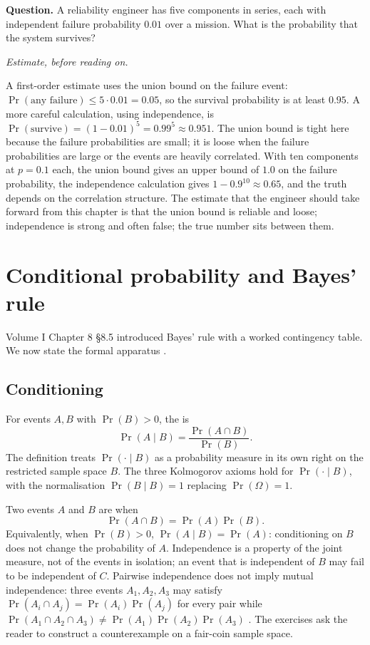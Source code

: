 \begin{estimation}
\textbf{Question.} A reliability engineer has five components in
series, each with independent failure probability $0.01$ over a
mission. What is the probability that the system survives?

\smallskip
\textit{Estimate, before reading on.}

\smallskip
A first-order estimate uses the union bound on the failure event:
$\Pr(\text{any failure}) \leq 5 \cdot 0.01 = 0.05$, so the survival
probability is at least $0.95$. A more careful calculation, using
independence, is $\Pr(\text{survive}) = (1 - 0.01)^{5} = 0.99^{5}
\approx 0.951$. The union bound is tight here because the failure
probabilities are small; it is loose when the failure probabilities
are large or the events are heavily correlated. With ten components
at $p = 0.1$ each, the union bound gives an upper bound of $1.0$ on
the failure probability, the independence calculation gives
$1 - 0.9^{10} \approx 0.65$, and the truth depends on the
correlation structure. The estimate that the engineer should take
forward from this chapter is that the union bound is reliable and
loose; independence is strong and often false; the true number sits
between them.
\end{estimation}

\section{Conditional probability and Bayes' rule}\label{sec:vol02:ch13:bayes}

Volume I Chapter 8 §8.5 introduced Bayes' rule with a worked
contingency table. We now state the formal apparatus
\cite[ch.~3]{text:ross-probability}.

\subsection{Conditioning}

For events $A, B$ with $\Pr(B) > 0$, the  is
\[
\Pr(A \mid B) = \frac{\Pr(A \cap B)}{\Pr(B)}.
\]
The definition treats $\Pr(\cdot \mid B)$ as a probability measure
in its own right on the restricted sample space $B$. The three
Kolmogorov axioms hold for $\Pr(\cdot \mid B)$, with the
normalisation $\Pr(B \mid B) = 1$ replacing $\Pr(\Omega) = 1$.

Two events $A$ and $B$ are  when
\[
\Pr(A \cap B) = \Pr(A) \Pr(B).
\]
Equivalently, when $\Pr(B) > 0$, $\Pr(A \mid B) = \Pr(A)$:
conditioning on $B$ does not change the probability of $A$.
Independence is a property of the joint measure, not of the events
in isolation; an event that is independent of $B$ may fail to be
independent of $C$. Pairwise independence does not imply mutual
independence: three events $A_{1}, A_{2}, A_{3}$ may satisfy
$\Pr(A_{i} \cap A_{j}) = \Pr(A_{i})\Pr(A_{j})$ for every pair while
$\Pr(A_{1} \cap A_{2} \cap A_{3}) \neq \Pr(A_{1})\Pr(A_{2})\Pr(A_{3})$
\cite[ch.~3]{text:ross-probability}. The exercises ask the reader to
construct a counterexample on a fair-coin sample space.

